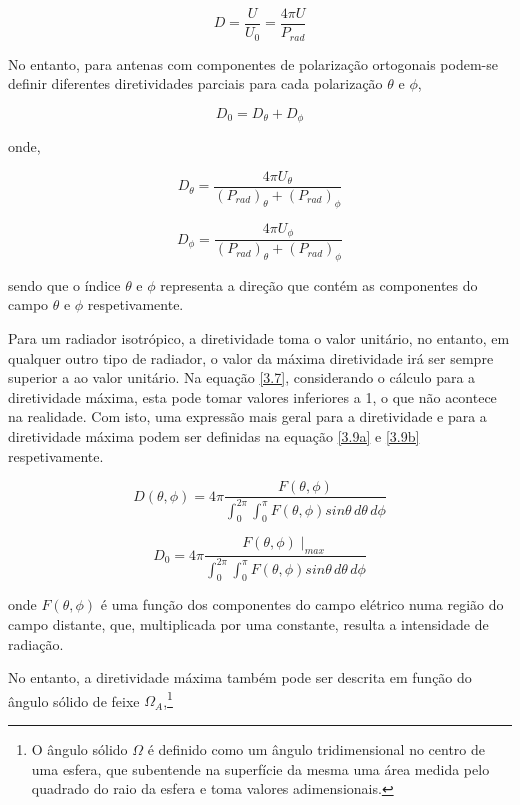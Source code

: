 \begin{equation} \label{3.7}
D=\dfrac{U}{U_{0}}=\dfrac{4\pi U}{P_{rad}}
\end{equation}

No entanto, para antenas com componentes de polarização ortogonais podem-se definir diferentes diretividades parciais para cada polarização $\theta$ e $\phi$,

\begin{equation} \label{3.8}
D_{0}=D_{\theta}+D_{\phi}
\end{equation}

onde, 

\begin{equation} \label{3.8a}
D_{\theta}=\dfrac{4\pi U_{\theta}}{\left( P_{rad}\right)_{\theta}+\left( P_{rad}\right)_{\phi}}
\end{equation}

\begin{equation} \label{3.8b}
D_{\phi}=\dfrac{4\pi U_{\phi}}{\left( P_{rad}\right)_{\theta}+\left( P_{rad}\right)_{\phi}}
\end{equation}

sendo que o índice $\theta$ e $\phi$ representa a direção que contém as componentes do campo $\theta$ e $\phi$ respetivamente.

Para um radiador isotrópico, a diretividade toma o valor unitário, no entanto, em qualquer outro tipo de radiador, o valor da máxima diretividade irá ser sempre superior a ao valor unitário. Na equação \ref{3.7}, considerando o cálculo para a diretividade máxima, esta pode tomar valores inferiores a 1, o que não acontece na realidade. Com isto, uma expressão mais geral para a diretividade e para a diretividade máxima podem ser definidas na equação \ref{3.9a} e \ref{3.9b} respetivamente.

\begin{equation} \label{3.9a}
D\left( \theta ,\phi\right)=4\pi\dfrac{F\left( \theta ,\phi\right)}{\int^{2\pi}_{0}\int^{\pi}_{0}F\left( \theta ,\phi\right)sin\theta\,d\theta \,d\phi} 
\end{equation}

\begin{equation} \label{3.9b}
D_{0}=4\pi\dfrac{F\left( \theta ,\phi\right)\mid_{max}}{\int^{2\pi}_{0}\int^{\pi}_{0}F\left( \theta ,\phi\right)sin\theta\,d\theta \,d\phi} 
\end{equation}

onde $F\left( \theta ,\phi\right)$ é uma função dos componentes do campo elétrico numa região do campo distante, que, multiplicada por uma constante, resulta a intensidade de radiação.\par 
No entanto, a diretividade máxima também pode ser descrita em função do ângulo sólido de feixe $\Omega_{A}$,\footnote{O ângulo sólido {$\Omega$} é definido como um ângulo tridimensional no centro de uma esfera, que subentende na superfície da mesma uma área medida pelo quadrado do raio da esfera e toma valores adimensionais.}

